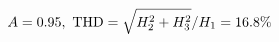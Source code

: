 \documentclass[preview]{standalone}
\begin{document}
\begin{align*}
\special{dvisvgm:raw <g id='unique000'>}A=0.95,\ \text{THD}=\sqrt{H_2^2+H_3^2}/H_1=16.8\%\special{dvisvgm:raw </g>}
\end{align*}
\end{document}

